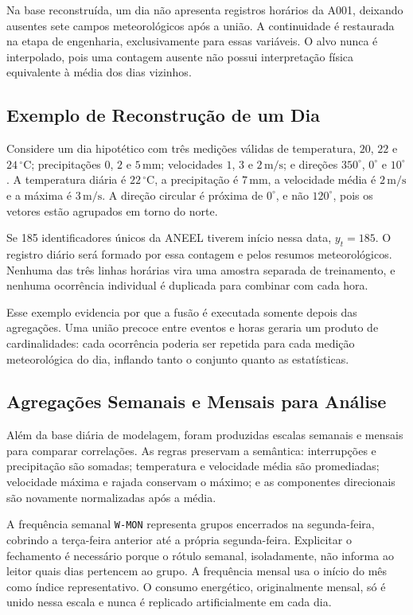 Na base reconstruída, um dia não apresenta registros horários da A001, deixando ausentes sete campos meteorológicos após a união. A continuidade é restaurada na etapa de engenharia, exclusivamente para essas variáveis. O alvo nunca é interpolado, pois uma contagem ausente não possui interpretação física equivalente à média dos dias vizinhos.

\subsection{Exemplo de Reconstrução de um Dia}

Considere um dia hipotético com três medições válidas de temperatura, $20$, $22$ e $24\,^{\circ}\mathrm{C}$; precipitações $0$, $2$ e $5\,\mathrm{mm}$; velocidades $1$, $3$ e $2\,\mathrm{m/s}$; e direções $350^\circ$, $0^\circ$ e $10^\circ$. A temperatura diária é $22\,^{\circ}\mathrm{C}$, a precipitação é $7\,\mathrm{mm}$, a velocidade média é $2\,\mathrm{m/s}$ e a máxima é $3\,\mathrm{m/s}$. A direção circular é próxima de $0^\circ$, e não $120^\circ$, pois os vetores estão agrupados em torno do norte.

Se 185 identificadores únicos da ANEEL tiverem início nessa data, $y_t=185$. O registro diário será formado por essa contagem e pelos resumos meteorológicos. Nenhuma das três linhas horárias vira uma amostra separada de treinamento, e nenhuma ocorrência individual é duplicada para combinar com cada hora.

Esse exemplo evidencia por que a fusão é executada somente depois das agregações. Uma união precoce entre eventos e horas geraria um produto de cardinalidades: cada ocorrência poderia ser repetida para cada medição meteorológica do dia, inflando tanto o conjunto quanto as estatísticas.

\subsection{Agregações Semanais e Mensais para Análise}

Além da base diária de modelagem, foram produzidas escalas semanais e mensais para comparar correlações. As regras preservam a semântica: interrupções e precipitação são somadas; temperatura e velocidade média são promediadas; velocidade máxima e rajada conservam o máximo; e as componentes direcionais são novamente normalizadas após a média.

A frequência semanal \texttt{W-MON} representa grupos encerrados na segunda-feira, cobrindo a terça-feira anterior até a própria segunda-feira. Explicitar o fechamento é necessário porque o rótulo semanal, isoladamente, não informa ao leitor quais dias pertencem ao grupo. A frequência mensal usa o início do mês como índice representativo. O consumo energético, originalmente mensal, só é unido nessa escala e nunca é replicado artificialmente em cada dia.

